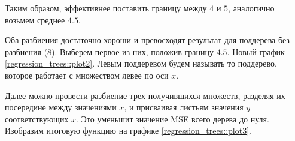 Таким образом, эффективнее поставить границу между $4$ и $5$, аналогично возьмем среднее $4.5$.

Оба разбиения достаточно хороши и превосходят результат для поддерева без разбиения ($8$). Выберем первое из них, положив границу $4.5$. Новый график - \ref{regression_trees::plot2}. Левым поддеревом будем называть то поддерево, которое работает с множеством левее по оси $x$.

\begin{center}
\end{center}

Далее можно провести разбиение трех получившихся множеств, разделяя их посередине между значениями $x$, и присваивая листьям значения $y$ соответствующих $x$. Это уменьшит значение MSE всего дерева до нуля. Изобразим итоговую функцию на графике \ref{regression_trees::plot3}.

